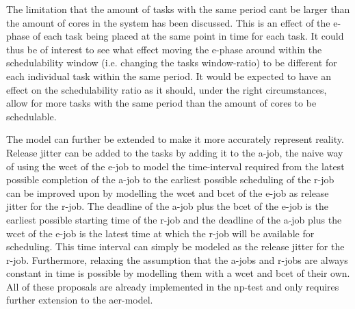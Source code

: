 \documentclass{kththesis}
\begin{document}
The limitation that the amount of tasks with the same period cant be larger than the amount of cores
in the system has been discussed. This is an effect of the \acrshort{e}-phase of each task being
placed at the same point in time for each task. It could thus be of interest to see what effect
moving the \acrshort{e}-phase around within the schedulability window (i.e. changing the tasks
window-ratio) to be different for each individual task within the same period. It would be expected
to have an effect on the schedulability ratio as it should, under the right circumstances, allow for
more tasks with the same period than the amount of cores to be schedulable.

The model can further be extended to make it more accurately represent reality. Release jitter can be
added to the tasks by adding it to the \acrshort{a}-job, the naive way of using the \acrshort{wcet}
of the \acrshort{e}-job to model the time-interval required from the latest possible completion of
the \acrshort{a}-job to the earliest possible scheduling of the \acrshort{r}-job can be improved
upon by modelling the \acrshort{wcet} and \acrshort{bcet} of the \acrshort{e}-job as release jitter
for the \acrshort{r}-job. The deadline of the \acrshort{a}-job plus the \acrshort{bcet} of the
\acrshort{e}-job is the earliest possible starting time of the \acrshort{r}-job and the deadline of
the \acrshort{a}-job plus the \acrshort{wcet} of the \acrshort{e}-job is the latest time at which
the \acrshort{r}-job will be available for scheduling. This time interval can simply be modeled as
the release jitter for the \acrshort{r}-job. Furthermore, relaxing the assumption that the
\acrshort{a}-jobs and \acrshort{r}-jobs are always constant in time is possible by modelling them
with a \acrshort{wcet} and \acrshort{bcet} of their own. All of these proposals are already
implemented in the \acrshort{np}-test and only requires further extension to the
\acrshort{aer}-model.


\printbibliography[heading=bibintoc] 

\appendix
\end{document}
